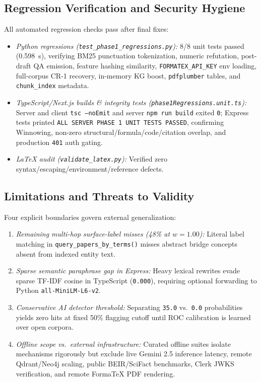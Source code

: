 \documentclass[conference]{IEEEtran}
\begin{document}
\subsection{Regression Verification and Security Hygiene}
All automated regression checks pass after final fixes:
\begin{itemize}
  \item \emph{Python regressions (\texttt{test\_phase1\_regressions.py}):} 8/8 unit tests passed (0.598~s), verifying BM25 punctuation tokenization, numeric refutation, post-draft QA emission, feature hashing similarity, \texttt{FORMATEX\_API\_KEY} env loading, full-corpus CR-1 recovery, in-memory KG boost, \texttt{pdfplumber} tables, and \texttt{chunk\_index} metadata.
  \item \emph{TypeScript/Next.js builds \& integrity tests (\texttt{phase1Regressions.unit.ts}):} Server and client \texttt{tsc --noEmit} and server \texttt{npm run build} exited \texttt{0}; Express tests printed \texttt{ALL SERVER PHASE 1 UNIT TESTS PASSED}, confirming Winnowing, non-zero structural/formula/code/citation overlap, and production \texttt{401} auth gating.
  \item \emph{LaTeX audit (\texttt{validate\_latex.py}):} Verified zero syntax/escaping/environment/reference defects.
\end{itemize}

\subsection{Limitations and Threats to Validity}
Four explicit boundaries govern external generalization:
\begin{enumerate}
  \item \emph{Remaining multi-hop surface-label misses (48\% at $w{=}1.00$):} Literal label matching in \texttt{query\_papers\_by\_terms()} misses abstract bridge concepts absent from indexed entity text.
  \item \emph{Sparse semantic paraphrase gap in Express:} Heavy lexical rewrites evade sparse TF-IDF cosine in TypeScript (\texttt{0.000}), requiring optional forwarding to Python \texttt{all-MiniLM-L6-v2}.
  \item \emph{Conservative AI detector threshold:} Separating \texttt{35.0} vs.\ \texttt{0.0} probabilities yields zero hits at fixed 50\% flagging cutoff until ROC calibration is learned over open corpora.
  \item \emph{Offline scope vs.\ external infrastructure:} Curated offline suites isolate mechanisms rigorously but exclude live Gemini 2.5 inference latency, remote Qdrant/Neo4j scaling, public BEIR/SciFact benchmarks, Clerk JWKS verification, and remote FormaTeX PDF rendering.
\end{enumerate}
\end{document}
